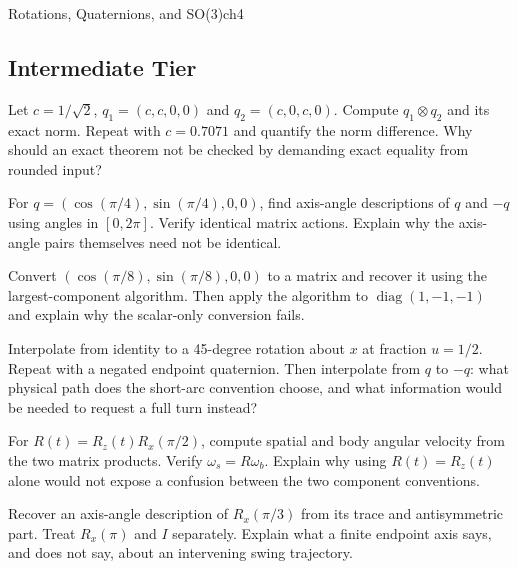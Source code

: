 \begin{exercises}{Rotations, Quaternions, and SO(3)}{ch4}
\subsection{Intermediate Tier}

\begin{exercise}
\label{ex:quaternion_product}
Let $c=1/\sqrt2$, $q_1=(c,c,0,0)$ and $q_2=(c,0,c,0)$. Compute $q_1\otimes q_2$ and its exact norm. Repeat with $c=0.7071$ and quantify the norm difference. Why should an exact theorem not be checked by demanding exact equality from rounded input?
\end{exercise}

\begin{exercise}
\label{ex:quaternion_double_cover}
For $q=(\cos(\pi/4),\sin(\pi/4),0,0)$, find axis-angle descriptions of $q$ and $-q$ using angles in $[0,2\pi]$. Verify identical matrix actions. Explain why the axis-angle pairs themselves need not be identical.
\end{exercise}

\begin{exercise}
\label{ex:quat_to_matrix}
Convert $(\cos(\pi/8),\sin(\pi/8),0,0)$ to a matrix and recover it using the largest-component algorithm. Then apply the algorithm to $\operatorname{diag}(1,-1,-1)$ and explain why the scalar-only conversion fails.
\end{exercise}

\begin{exercise}
\label{ex:slerp_interpolation}
Interpolate from identity to a 45-degree rotation about $x$ at fraction $u=1/2$. Repeat with a negated endpoint quaternion. Then interpolate from $q$ to $-q$: what physical path does the short-arc convention choose, and what information would be needed to request a full turn instead?
\end{exercise}

\begin{exercise}
\label{ex:angular_velocity_skew}
For $R(t)=R_z(t)R_x(\pi/2)$, compute spatial and body angular velocity from the two matrix products. Verify $\omega_s=R\omega_b$. Explain why using $R(t)=R_z(t)$ alone would not expose a confusion between the two component conventions.
\end{exercise}

\begin{exercise}
\label{ex:axis_angle_from_matrix}
Recover an axis-angle description of $R_x(\pi/3)$ from its trace and antisymmetric part. Treat $R_x(\pi)$ and $I$ separately. Explain what a finite endpoint axis says, and does not say, about an intervening swing trajectory.
\end{exercise}


\end{exercises}
